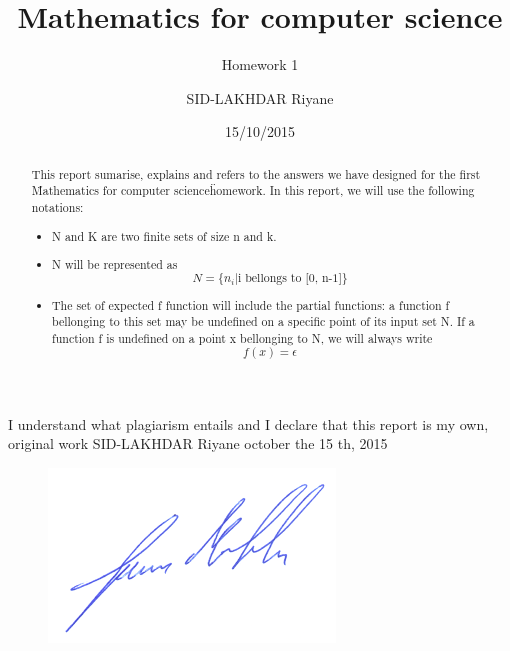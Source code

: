 \documentclass[a4paper,10pt]{article}
\title{Mathematics for computer science}
\subtitle{Homework 1}
\author{SID-LAKHDAR Riyane}
\date{15/10/2015}
\begin{document}


\maketitle


I understand what plagiarism entails and I declare that this report is my own, original work
SID-LAKHDAR
Riyane
october the 15 th, 2015
\begin{figure}[ht!]
  \center
  \includegraphics[width=0.8\linewidth]{signature.png}
\end{figure}




\begin{abstract}
    This report sumarise, explains and refers to the answers we have designed for the first \"Mathematics for computer science\" homework.\newline 
    In this report, we will use the following notations:\newline
    \begin{itemize}
      \item N and K are two finite sets of size n and k.
      \item N will be represented as
	\begin{equation} N = \{n_{i}| \mbox{i bellongs to [0, n-1]}\}\end{equation}
      \item The set of expected f function will include the partial functions: a function f bellonging to this set may be undefined on a specific point of its input set N.\newline
	If a function f is undefined on a point x bellonging to N, we will always write \begin{equation} f(x) = \epsilon \end{equation}
    \end{itemize}
\end{abstract}
\end{document}
